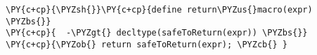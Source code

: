 \begin{Verbatim}[commandchars=\\\{\}]
\PY{c+cp}{\PYZsh{}}\PY{c+cp}{define return\PYZus{}macro(expr) \PYZbs{}}
\PY{c+cp}{  -\PYZgt{} decltype(safeToReturn(expr)) \PYZbs{}}
\PY{c+cp}{\PYZob{} return safeToReturn(expr); \PYZcb{} }
\end{Verbatim}
